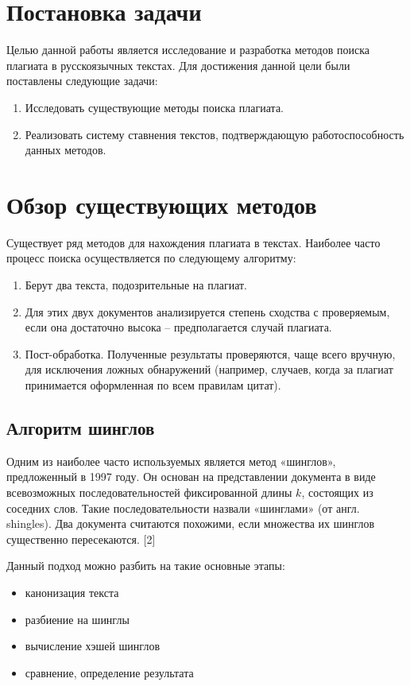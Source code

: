 \documentclass[a4paper,12pt,oneside]{article}
\begin{document}
\section{Постановка задачи}
Целью данной работы является исследование и разработка методов поиска плагиата в русскоязычных текстах. Для достижения данной цели были поставлены следующие задачи:
\begin{enumerate}
\item Исследовать существующие методы поиска плагиата.
\item Реализовать систему ставнения текстов, подтверждающую работоспособность данных методов.
\end{enumerate}

\section{Обзор существующих методов}
Существует ряд методов для нахождения плагиата в текстах. Наиболее часто процесс поиска осуществляется по следующему алгоритму:
\begin{enumerate}
\item Берут два текста, подозрительные на плагиат. 
\item Для этих двух документов анализируется степень сходства с проверяемым, если она достаточно высока – предполагается случай плагиата.
\item Пост-обработка. Полученные результаты проверяются, чаще всего вручную, для исключения ложных обнаружений (например, случаев, когда за плагиат принимается оформленная по всем правилам цитат).
\end{enumerate}

\subsection{Алгоритм шинглов}
Одним из наиболее часто используемых является метод «шинглов», предложенный в 1997 году. Он основан на представлении документа в виде всевозможных последовательностей фиксированной длины $k$, состоящих из соседних слов. Такие последовательности назвали «шинглами» (от англ. shingles). Два документа считаются похожими, если множества их шинглов существенно пересекаются. [2]

Данный подход можно разбить на такие основные этапы:
\begin{itemize}
\item канонизация текста
\item разбиение на шинглы
\item вычисление хэшей шинглов
\item сравнение, определение результата
\end{itemize}
\end{document}
